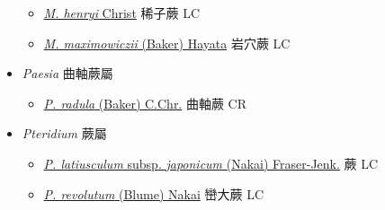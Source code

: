 \begin{itemize}
  \begin{itemize}
        \item[] \href{http://www.theplantlist.org/tpl1.1/search?q=Monachosorum+henryi}{\textit{M. henryi} Christ}   稀子蕨   LC
        \item[] \href{http://www.theplantlist.org/tpl1.1/search?q=Monachosorum+maximowiczii}{\textit{M. maximowiczii} (Baker) Hayata}   岩穴蕨   LC
  \end{itemize}
 \item[    ] \textit{Paesia} 曲軸蕨屬
                                
  \begin{itemize}
        \item[] \href{http://www.theplantlist.org/tpl1.1/search?q=Paesia+radula}{\textit{P. radula} (Baker) C.Chr.}   曲軸蕨   CR
  \end{itemize}
 \item[    ] \textit{Pteridium} 蕨屬
                                
  \begin{itemize}
        \item[] \href{http://www.theplantlist.org/tpl1.1/search?q=Pteridium+latiusculum+subsp.+japonicum}{\textit{P. latiusculum}  subsp. \textit{japonicum} (Nakai) Fraser-Jenk.}  
                                        蕨   LC
        \item[] \href{http://www.theplantlist.org/tpl1.1/search?q=Pteridium+revolutum}{\textit{P. revolutum} (Blume) Nakai}   巒大蕨   LC
  \end{itemize}
  \end{itemize}
